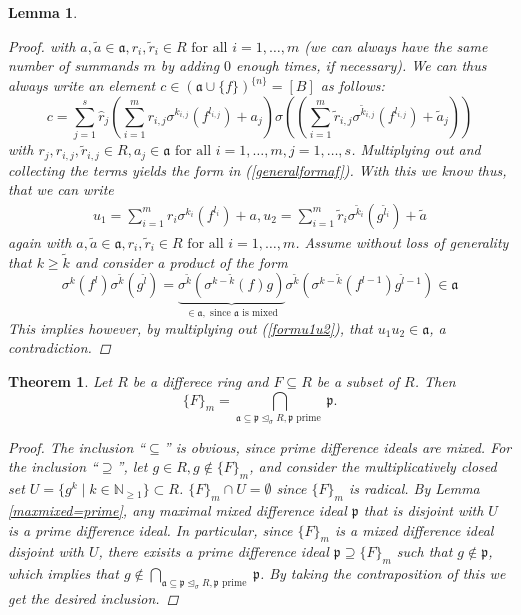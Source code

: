 \documentclass{article}
\def\NE{\mathbb{N}_{\geq1}}
\def\a{\mathfrak{a}}
\def\p{\mathfrak{p}}
\def\s{\sigma}
\def\si{\unlhd_{\sigma}}
\def\fa{\text{ for all }}
\newenvironment{bew}{\begin{proof}[Proof]}{\end{proof}}
\theoremstyle{plain}
\newtheorem{theorem}[Satz]{Theorem}
\newtheorem{lem}[Satz]{Lemma}
\theoremstyle{definition}
\begin{document}
\begin{lem}
\begin{bew}
with $a, \tilde a \in \a, r_i, \tilde r_i \in R \fa i = 1,\ldots,m$ (we can always have the same number of summands $m$ by adding $0$ enough times, if necessary).
 We can thus always write an element $c \in  (\a \cup \{f\})^{\{n\}} = [B]$ as follows:
\[ c = \sum_{j=1}^s \hat r_j (\sum_{i=1}^{m} r_{i,j} \s^{k_{i,j}}(f^{l_{i,j}}) + a_j)\s((\sum_{i=1}^{m} \tilde r_{i,j} \s^{\tilde k_{i,j}}(f^{l_{i,j}}) + \tilde a_j)) \]
with $r_j, r_{i,j}, \tilde r_{i,j} \in R, a_j \in \a \fa i = 1,\ldots, m, j = 1, \ldots, s$. Multiplying out and collecting the terms yields the form in (\ref{generalformaf}).
With this we know thus, that we can write 
\begin{align}\label{formu1u2} u_1 = \sum_{i=1}^m r_i \s^{k_i}(f^{l_i}) + a, u_2 = \sum_{i=1}^m \tilde r_i \s^{\tilde k_i}(g^{\tilde l_i}) + \tilde a \end{align}
again with $a, \tilde a \in \a, r_i, \tilde r_i \in R \fa i = 1,\ldots,m$. 
Assume without loss of generality that $k \geq \tilde k$ and consider a product of the form 
\[ \s^{k}(f^{l}) \s^{\tilde k}(g^{\tilde l}) = \underbrace{\s^{\tilde k}(\s^{k - \tilde k}(f) g)}_{\in \a, \text{ since } \a \text{ is mixed}} \s^{\tilde k}(\s^{k - \tilde k}(f^{l-1}) g^{\tilde l - 1}) \in \a \]
This implies however, by multiplying out (\ref{formu1u2}), that $u_1 u_2 \in \a$, a contradiction.
\end{bew}
\end{lem}

\begin{theorem}
Let $R$ be a differece ring and $F \subseteq R$ be a subset of $R$. Then
\[ \{ F \}_m = \bigcap_{\a \subseteq \p \si R, \p \text{ prime }} \p.\]
\begin{proof}
The inclusion ``$\subseteq$'' is obvious, since prime difference ideals are mixed. For the inclusion ``$\supseteq$'', let $g \in R, g \notin \{ F \}_m$, and consider the multiplicatively closed set $U = \{ g^k \mid k \in \NE \} \subset R$. 
$\{ F \}_m \cap U = \emptyset$ since $\{ F \}_m$ is radical. By Lemma \ref{maxmixed=prime}, any maximal mixed difference ideal $\p$ that is disjoint with $U$ is a prime difference ideal. In particular, since $\{F\}_m$ is a mixed difference ideal disjoint with $U$, there exisits a prime difference ideal $\p \supseteq \{F\}_m$ such that $g \notin \p$,
which implies that $g \notin \bigcap_{\a \subseteq \p \si R, \p \text{ prime }} \p$. By taking the contraposition of this we get the desired inclusion.
\end{proof}
\end{theorem}
\end{document}
